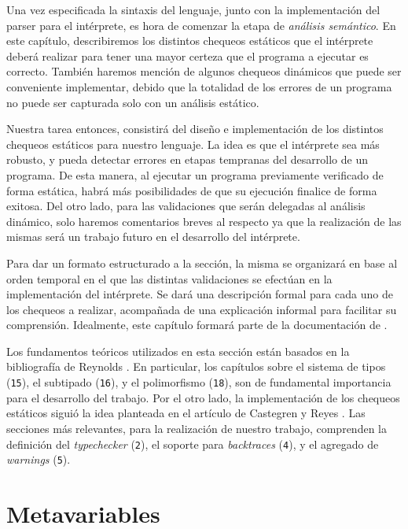 Una vez especificada la sintaxis del lenguaje, junto con la implementación del parser para el intérprete, es hora de comenzar la etapa de \textit{análisis semántico}.
En este capítulo, describiremos los distintos chequeos estáticos que el intérprete deberá realizar para tener una mayor certeza que el programa a ejecutar es correcto.
También haremos mención de algunos chequeos dinámicos que puede ser conveniente implementar, debido que la totalidad de los errores de un programa no puede ser capturada solo con un análisis estático.

Nuestra tarea entonces, consistirá del diseño e implementación de los distintos chequeos estáticos para nuestro lenguaje.
La idea es que el intérprete sea más robusto, y pueda detectar errores en etapas tempranas del desarrollo de un programa.
De esta manera, al ejecutar un programa previamente verificado de forma estática, habrá más posibilidades de que su ejecución finalice de forma exitosa.
Del otro lado, para las validaciones que serán delegadas al análisis dinámico, solo haremos comentarios breves al respecto ya que la realización de las mismas será un trabajo futuro en el desarrollo del intérprete.

Para dar un formato estructurado a la sección, la misma se organizará en base al orden temporal en el que las distintas validaciones se efectúan en la implementación del intérprete.
Se dará una descripción formal para cada uno de los chequeos a realizar, acompañada de una explicación informal para facilitar su comprensión.
Idealmente, este capítulo formará parte de la documentación de \Lenguaje{}.

Los fundamentos teóricos utilizados en esta sección están basados en la bibliografía de Reynolds \cite{Reynolds}.
En particular, los capítulos sobre el sistema de tipos (\texttt{15}), el subtipado (\texttt{16}), y el polimorfismo (\texttt{18}), son de fundamental importancia para el desarrollo del trabajo.
Por el otro lado, la implementación de los chequeos estáticos siguió la idea planteada en el artículo de Castegren y Reyes \cite{MonadicTC}.
Las secciones más relevantes, para la realización de nuestro trabajo, comprenden la definición del \textit{typechecker} (\texttt{2}), el soporte para \textit{backtraces} (\texttt{4}), y el agregado de \textit{warnings} (\texttt{5}).

\section{Metavariables}

